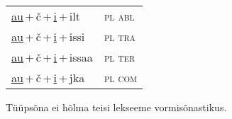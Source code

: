 \begin{minipage}{\textwidth}
\begin{sideways}
\begin{tabular}{l l}
\underline{au}\,+\,č\,+\,\underline{i}\,+\,ilt & \textsc{ pl abl } \\
\underline{au}\,+\,č\,+\,\underline{i}\,+\,issi & \textsc{ pl tra } \\
\underline{au}\,+\,č\,+\,\underline{i}\,+\,issaa & \textsc{ pl ter } \\
\underline{au}\,+\,č\,+\,\underline{i}\,+\,jka & \textsc{ pl com } \\
\end{tabular}
\end{sideways}
\label{tab:tüüpsõnamall-auči}

\end{minipage}

 
\vspace{1em}
\noindent Tüüpsõna ei hõlma teisi lekseeme vormi\-sõnastikus.
